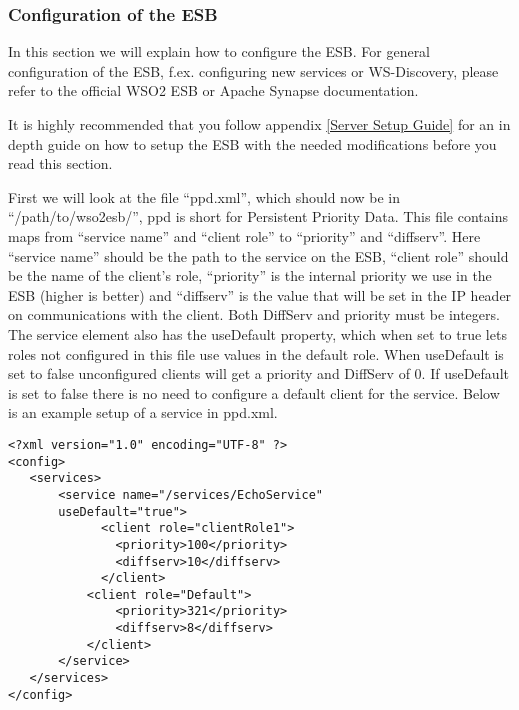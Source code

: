     \subsubsection{Configuration of the ESB}\label{Configuration of the ESB} 
	In this section we will explain how to configure the ESB. For general configuration of the ESB, f.ex. configuring new services or WS-Discovery, please refer to the official WSO2 ESB or Apache Synapse documentation.

	\begin{shaded}
	It is highly recommended that you follow appendix \ref{Server Setup Guide} for an in depth guide on how to setup the ESB with the needed modifications before you read this section.
	\end{shaded}

	First we will look at the file “ppd.xml”, which should now be in “/path/to/wso2esb/”, ppd is short for Persistent Priority Data. This file contains maps from “service name” and “client role” to “priority” and “diffserv”. Here “service name” should be the path to the service on the ESB, “client role” should be the name of the client’s role, “priority” is the internal priority we use in the ESB (higher is better) and “diffserv” is the value that will be set in the IP header on communications with the client. Both DiffServ and priority must be integers.
	The service element also has the useDefault property, which when set to true lets roles not configured in this file use values in the default role. When useDefault is set to false unconfigured clients will get a priority and DiffServ of 0. If useDefault is set to false there is no need to configure a default client for the service.
	Below is an example setup of a service in ppd.xml.\\

\lstset{language=XML, style=eclipse}
\lstset{showstringspaces=false}
\begin{lstlisting}[frame=single, caption={ms.xml}, label=ms listing, breaklines=true] %Ok to not have this referenced =)
<?xml version="1.0" encoding="UTF-8" ?>
<config>
   <services>
	   <service name="/services/EchoService" 
	   useDefault="true">
	         <client role="clientRole1">
	           <priority>100</priority>
	           <diffserv>10</diffserv>
	         </client>
	       <client role="Default">
	           <priority>321</priority>
	           <diffserv>8</diffserv>
	       </client>
	   </service>
   </services>
</config>
\end{lstlisting}

